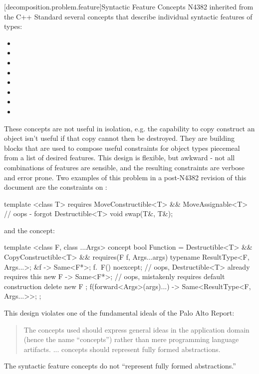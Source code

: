 [decomposition.problem.feature]{Syntactic Feature Concepts}
\pnum
N4382 inherited from the C++ Standard several concepts that describe individual syntactic
features of types:
\begin{itemize}
\item {}
\item {}
\item {}
\item {}
\item {}
\item {}
\item {}
\item {}
\end{itemize}
These concepts are not useful in isolation, e.g. the capability to copy construct an object
isn't useful if that copy cannot then be destroyed. They are building blocks that are used
to compose useful constraints for object types piecemeal from a list of desired features.
This design is flexible, but awkward - not all combinations of features are sensible, and
the resulting constraints are verbose and error prone. Two examples of this problem in
a post-N4382 revision of this document are the constraints on  :
\begin{codeblock}
template <class T>
  requires MoveConstructible<T> && MoveAssignable<T> // oops - forgot Destructible<T>
void swap(T&, T&);
\end{codeblock}
and the  concept:
\begin{codeblock}
template <class F, class ...Args>
concept bool Function =
  Destructible<T> &&
  CopyConstructible<T> &&
  requires(F f, Args...args) {
    typename ResultType<F, Args...>;
    { &f } -> Same<F*>;
    { f.~F() } noexcept;   // oops, Destructible<T> already requires this
    { new F } -> Same<F*>; // oops, mistakenly requires default construction
    { delete new F };
    { f(forward<Args>(args)...) } -> Same<ResultType<F, Args...>{}>;
  };
\end{codeblock}

\pnum
This design violates one of the fundamental ideals of the Palo Alto Report:
\begin{quote}
The concepts used should express general ideas in the application domain (hence the name
``concepts'') rather than mere programming language artifacts. ... concepts should represent
fully formed abstractions.
\end{quote}
The syntactic feature concepts do not ``represent fully formed abstractions.''

